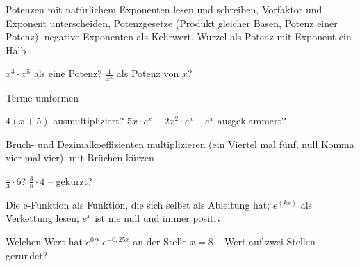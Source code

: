 \setcounter{aufgabe}{0}

\begin{aufgabe}{Potenzen mit natürlichem Exponenten lesen und schreiben, Vorfaktor und Exponent unterscheiden, Potenzgesetze (Produkt gleicher Basen, Potenz einer Potenz), negative Exponenten als Kehrwert, Wurzel als Potenz mit Exponent ein Halb}
\begin{teile}
\teil $x^3 \cdot x^5$ als eine Potenz? \leerfeld
\teil $\frac{1}{x^5}$ als Potenz von $x$? \leerfeld
\end{teile}
\end{aufgabe}

\begin{aufgabe}{Terme umformen}
\begin{teile}
\teil $4(x + 5)$ ausmultipliziert? \leerfeld
\teil $5x \cdot e^x - 2x^2 \cdot e^x$ – $e^x$ ausgeklammert? \leerfeld
\end{teile}
\end{aufgabe}

\begin{aufgabe}{Bruch- und Dezimalkoeffizienten multiplizieren (ein Viertel mal fünf, null Komma vier mal vier), mit Brüchen kürzen}
\begin{teile}
\teil $\frac{1}{3} \cdot 6$? \leerfeld
\teil $\frac{3}{8} \cdot 4$ – gekürzt? \leerfeld
\end{teile}
\end{aufgabe}

\begin{aufgabe}{Die e-Funktion als Funktion, die sich selbst als Ableitung hat; $e^{(kx)}$ als Verkettung lesen; $e^x$ ist nie null und immer positiv}
\begin{teile}
\teil Welchen Wert hat $e^0$? \leerfeld
\teil $e^{-0{,}25x}$ an der Stelle $x = 8$ – Wert auf zwei Stellen gerundet? \leerfeld
\end{teile}
\end{aufgabe}

